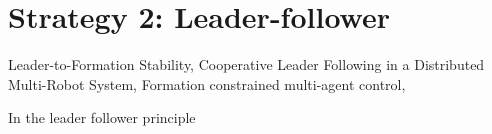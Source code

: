 \section{Strategy 2: Leader-follower}
Leader-to-Formation Stability,
Cooperative Leader Following in a Distributed Multi-Robot System,
Formation constrained multi-agent control, 

In the leader follower principle
